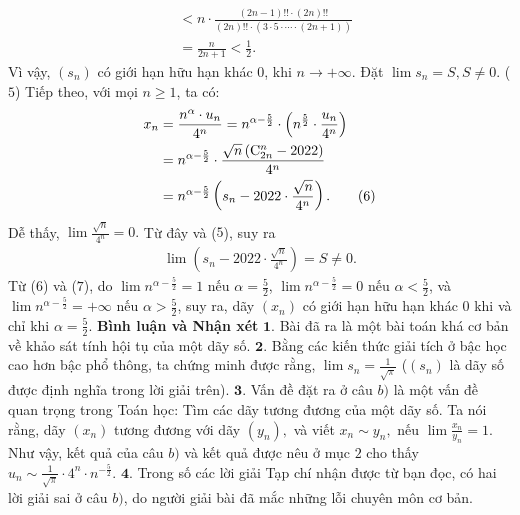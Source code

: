 \begin{multicols}{2}
\begin{align*}
		&< n \cdot \frac{{\left( {2n - 1} \right)!! \cdot \left( {2n} \right)!!}}{{\left( {2n} \right)!! \cdot \left( {3 \cdot 5 \cdot  \cdots  \cdot \left( {2n + 1} \right)} \right)}} \\
		&= \frac{n}{{2n + 1}} < \frac{1}{2}.
	\end{align*}
	Vì vậy, $(s_n)$  có giới hạn hữu hạn khác $0$, khi $n \to +\infty$.  Đặt $\lim {s_n} = S,   S \ne  0$.  \hfill                                 ($5$)
	\vskip 0.05cm
	Tiếp theo, với mọi $n \ge  1$, ta có:
	\begin{align*}
		{x_n} &= \frac{{{n^\alpha } \cdot {u_n}}}{{{4^n}}} = {n^{\alpha  - \frac{5}{2}}} \cdot \left( {{n^{\frac{5}{2}}} \cdot \frac{{{u_n}}}{{{4^n}}}} \right) \\
		&= {n^{\alpha  - \frac{5}{2}}} \cdot \frac{{\sqrt n \left( {{\rm{C}}_{2n}^n - 2022} \right)}}{{{4^n}}} \\
		&= {n^{\alpha  - \frac{5}{2}}}\left( {{s_n} - 2022 \cdot \frac{{\sqrt n }}{{{4^n}}}} \right). \tag{$6$}
	\end{align*}
	Dễ thấy, $\lim \frac{{\sqrt n }}{{{4^n}}} = 0.$  Từ đây và ($5$), suy ra
	\begin{align*}
		\lim \left( {{s_n} - 2022 \cdot \frac{{\sqrt n }}{{{4^n}}}} \right) = S \ne 0. \tag{$7$}
	\end{align*}
	Từ ($6$) và ($7$), do $\lim {n^{\alpha  - \frac{5}{2}}} = 1$  nếu $\alpha  = \frac{5}{2}$, $\lim {n^{\alpha  - \frac{5}{2}}} = 0$  nếu  $\alpha  < \frac{5}{2}$, và $\lim {n^{\alpha  - \frac{5}{2}}} =  + \infty $  nếu  $\alpha  > \frac{5}{2}$, suy ra, dãy $(x_n)$  có giới hạn hữu hạn khác $0$ khi và chỉ khi  $\alpha  = \frac{5}{2}$.
	\vskip 0.05cm
	\textbf{\color{thachthuctoanhoc}Bình luận và Nhận xét}
	\vskip 0.05cm
	$\pmb{1.}$ Bài đã ra là một bài toán khá cơ bản về khảo sát tính hội tụ của một dãy số.
	\vskip 0.05cm
	$\pmb{2.}$ Bằng các kiến thức giải tích ở bậc học cao hơn bậc phổ thông, ta chứng minh được rằng, $\lim {s_n} = \frac{1}{{\sqrt \pi  }}$   ($(s_n)$  là dãy số được định nghĩa trong lời giải trên).
	\vskip 0.05cm
	$\pmb{3.}$ Vấn đề đặt ra ở câu $b)$ là một vấn đề quan trọng trong Toán học: Tìm các dãy tương đương của một dãy số.
	\vskip 0.05cm
	Ta nói rằng, dãy $\left( {{x_n}} \right)$  tương đương với dãy $\left( {{y_n}} \right),$  và viết  ${x_n} \sim {y_n},$ nếu  $\lim \frac{{{x_n}}}{{{y_n}}} = 1.$
	\vskip 0.05cm
	Như vậy, kết quả của câu $b)$ và kết quả được nêu ở mục $2$ cho thấy ${u_n} \sim \frac{1}{{\sqrt \pi  }} \cdot {4^n} \cdot {n^{ - \frac{5}{2}}}.$
	\vskip 0.05cm 
	$\pmb{4.}$ Trong số các lời giải Tạp chí nhận được từ bạn đọc, có hai lời giải sai ở câu $b)$, do người giải bài đã mắc những lỗi chuyên môn cơ bản.

\end{multicols}
